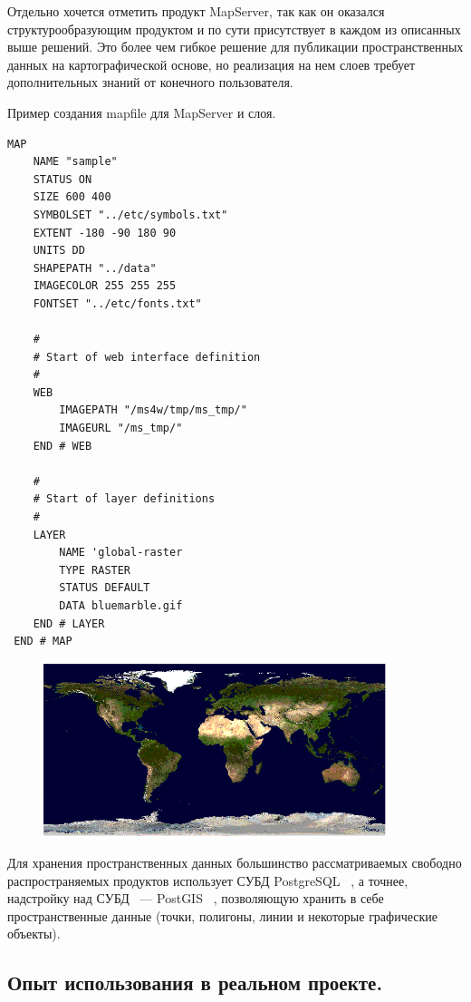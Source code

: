 \documentclass[10pt, a5paper]{article}
\begin{document}
Отдельно хочется отметить продукт MapServer, так как он оказался структурообразующим продуктом и по сути присутствует в каждом из описанных выше решений. Это более чем гибкое решение для публикации пространственных данных на картографической основе, но реализация на нем слоев требует дополнительных знаний от конечного пользователя.

Пример создания mapfile для MapServer и слоя.

\begin{verbatim}
MAP
    NAME "sample"
    STATUS ON
    SIZE 600 400
    SYMBOLSET "../etc/symbols.txt"
    EXTENT -180 -90 180 90
    UNITS DD
    SHAPEPATH "../data"
    IMAGECOLOR 255 255 255
    FONTSET "../etc/fonts.txt"

    #
    # Start of web interface definition
    #
    WEB
        IMAGEPATH "/ms4w/tmp/ms_tmp/"
        IMAGEURL "/ms_tmp/"
    END # WEB

    #
    # Start of layer definitions
    #
    LAYER
        NAME 'global-raster
        TYPE RASTER
        STATUS DEFAULT
        DATA bluemarble.gif
    END # LAYER
 END # MAP
\end{verbatim}

\begin{center}

\begin{figure}[h!]
  \centering
  \includegraphics[width=10cm]{stepanov1.jpg}
  
  \label{Stepanov1}
\end{figure}

\end{center}


Для хранения пространственных данных большинство рассматриваемых свободно распространяемых продуктов использует СУБД PostgreSQL ~\cite{Stepanov-8}, а точнее, надстройку над СУБД ~--- PostGIS ~\cite{Stepanov-9}, позволяющую хранить в себе пространственные данные (точки, полигоны, линии и некоторые графические объекты).

\subsection*{Опыт использования в реальном проекте.}
\end{document}
